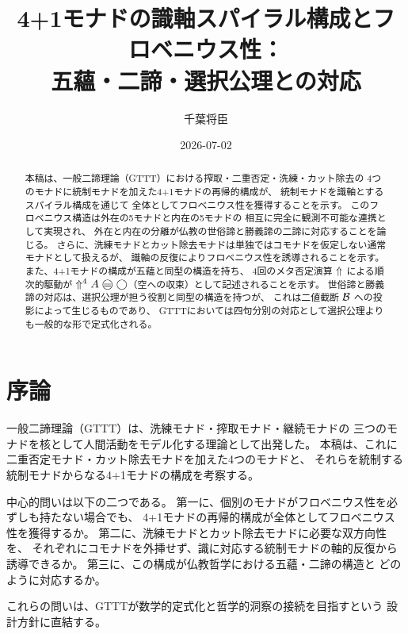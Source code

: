 \documentclass[11pt,a4paper]{article}
\theoremstyle{definition}
\begin{document}
\title{4+1モナドの識軸スパイラル構成とフロベニウス性：\\
五蘊・二諦・選択公理との対応}
\author{千葉将臣}
\date{2026-07-02}

\maketitle

\begin{abstract}
本稿は、一般二諦理論（GTTT）における搾取・二重否定・洗練・カット除去の
4つのモナドに統制モナドを加えた4+1モナドの再帰的構成が、
統制モナドを識軸とするスパイラル構成を通じて
全体としてフロベニウス性を獲得することを示す。
このフロベニウス構造は外在の5モナドと内在の5モナドの
相互に完全に観測不可能な連携として実現され、
外在と内在の分離が仏教の世俗諦と勝義諦の二諦に対応することを論じる。
さらに、洗練モナドとカット除去モナドは単独ではコモナドを仮定しない通常モナドとして扱えるが、
識軸の反復によりフロベニウス性を誘導されることを示す。
また、4+1モナドの構成が五蘊と同型の構造を持ち、
4回のメタ否定演算 $\Uparrow$ による順次的駆動が
$\metanegation^4 A \mweq \dfix$（空への収束）として記述されることを示す。
世俗諦と勝義諦の対応は、選択公理が担う役割と同型の構造を持つが、
これは二値截断 $\mathcal{B}$ への投影によって生じるものであり、
GTTTにおいては四句分別の対応として選択公理よりも一般的な形で定式化される。
\end{abstract}

\tableofcontents
\newpage

\section{序論}

一般二諦理論（GTTT）は、洗練モナド・搾取モナド・継続モナドの
三つのモナドを核として人間活動をモデル化する理論として出発した。
本稿は、これに二重否定モナド・カット除去モナドを加えた4つのモナドと、
それらを統制する統制モナドからなる4+1モナドの構成を考察する。

中心的問いは以下の二つである。
第一に、個別のモナドがフロベニウス性を必ずしも持たない場合でも、
4+1モナドの再帰的構成が全体としてフロベニウス性を獲得するか。
第二に、洗練モナドとカット除去モナドに必要な双方向性を、
それぞれにコモナドを外挿せず、識に対応する統制モナドの軸的反復から誘導できるか。
第三に、この構成が仏教哲学における五蘊・二諦の構造と
どのように対応するか。

これらの問いは、GTTTが数学的定式化と哲学的洞察の接続を目指すという
設計方針に直結する。
\end{document}

